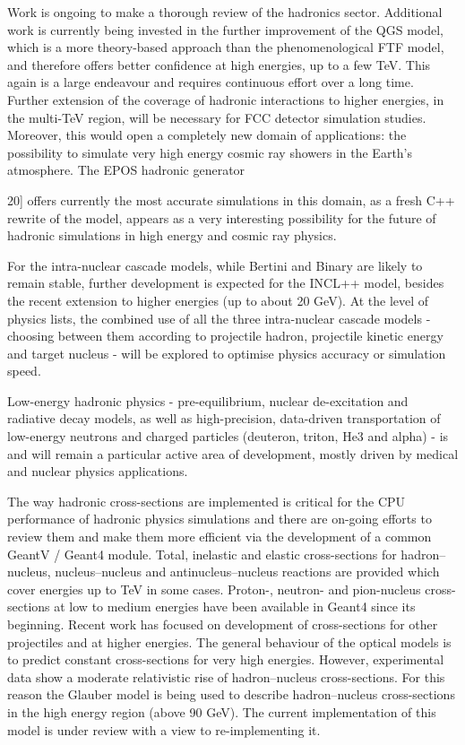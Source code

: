 \documentclass[12pt,a4paper]{article}
\begin{document}
Work is ongoing to make a thorough review of the hadronics sector.
Additional work is currently being invested in the further improvement
of the QGS model, which is a more theory-based approach than the
phenomenological FTF model, and therefore offers better confidence at
high energies, up to a few TeV. This again is a large endeavour and
requires continuous effort over a long time. Further extension of the
coverage of hadronic interactions to higher energies, in the multi-TeV
region, will be necessary for FCC detector simulation studies. Moreover,
this would open a completely new domain of applications: the possibility
to simulate very high energy cosmic ray showers in the Earth's
atmosphere. The EPOS hadronic generator ~{20{]} offers currently the
most accurate simulations in this domain, as a fresh C++ rewrite of the
model, appears as a very interesting possibility for the future of
hadronic simulations in high energy and cosmic ray physics.

For the intra-nuclear cascade models, while Bertini and Binary are
likely to remain stable, further development is expected for the INCL++
model, besides the recent extension to higher energies (up to about 20
GeV). At the level of physics lists, the combined use of all the three
intra-nuclear cascade models - choosing between them according to
projectile hadron, projectile kinetic energy and target nucleus - will
be explored to optimise physics accuracy or simulation speed.

Low-energy hadronic physics - pre-equilibrium, nuclear de-excitation and
radiative decay models, as well as high-precision, data-driven
transportation of low-energy neutrons and charged particles (deuteron,
triton, He3 and alpha) - is and will remain a particular active area of
development, mostly driven by medical and nuclear physics applications.

The way hadronic cross-sections are implemented is critical for the CPU
performance of hadronic physics simulations and there are on-going
efforts to review them and make them more efficient via the development
of a common GeantV / Geant4 module. Total, inelastic and elastic
cross-sections for hadron--nucleus, nucleus--nucleus and
antinucleus--nucleus reactions are provided which cover energies up to
TeV in some cases. Proton-, neutron- and pion-nucleus cross-sections at
low to medium energies have been available in Geant4 since its
beginning. Recent work has focused on development of cross-sections for
other projectiles and at higher energies. The general behaviour of the
optical models is to predict constant cross-sections for very high
energies. However, experimental data show a moderate relativistic rise
of hadron--nucleus cross-sections. For this reason the Glauber model is
being used to describe hadron--nucleus cross-sections in the high energy
region (above 90 GeV). The current implementation of this model is under
review with a view to re-implementing it.

}
\end{document}
